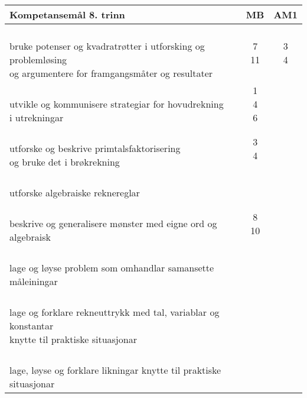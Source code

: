 \documentclass{article}
\begin{document}
\begin{center}
	\begin{tabular}{p{10.5cm} | c | c |} 
		\textbf{Kompetansemål 8. trinn} & \textbf{MB} & \textbf{AM1}\\ \hline
		\shortstack[l]{\\ bruke potenser og kvadratrøtter i utforsking og problemløsing\\ og argumentere for framgangsmåter og resultater
		} &\shortstack{7\\ 11} &\shortstack{3 \\ 4} \\ \hline
		
		\shortstack[l]{\\utvikle og kommunisere strategiar for hovudrekning \\i utrekningar \\{}
		} &\shortstack{1 \\ 4\\6} &\shortstack{} \\ \hline
		
		\shortstack[l]{\\ utforske og beskrive primtalsfaktorisering \\og bruke det i brøkrekning
		} &\shortstack{3\\4} &\shortstack{} \\ \hline
		
		\shortstack[l]{\\ utforske algebraiske reknereglar
		} &\shortstack{7} &\shortstack{} \\ \hline
		
		\shortstack[l]{\\ beskrive og generalisere mønster med eigne ord og algebraisk \\ \phantom{a}
		} &\shortstack{8\\10} &\shortstack{} \\ \hline
		
		\shortstack[l]{\\lage og løyse problem som omhandlar samansette måleiningar
		} &\shortstack{} &\shortstack{1} \\ \hline
		
		\shortstack[l]{\\ lage og forklare rekneuttrykk med tal, variablar og konstantar \\knytte til praktiske situasjonar
		} &\shortstack{} &\shortstack{alle} \\ \hline
		
		\shortstack[l]{\\ lage, løyse og forklare likningar knytte til praktiske situasjonar \\\phantom{text}
		} &\shortstack{} &\shortstack{6} \\ \hline
		

\end{tabular}
\end{center}
\end{document}

